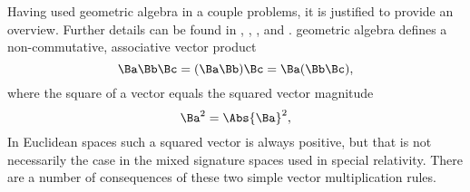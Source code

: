 %
%
%
Having used geometric algebra in a couple problems, it is justified to provide an overview.  Further details can be found in
\citep{dorst2007gac},
\citep{doran2003gap},
\citep{aMacdonaldVAGC},
and
\citep{hestenes1999nfc}.
%
geometric algebra defines a non-commutative, associative vector product
%
\begin{equation}\label{eqn:gaTutorial:20}
\Ba \Bb \Bc
=
(\Ba \Bb) \Bc
=
\Ba (\Bb \Bc),
\end{equation}
%
where the square of a vector equals the squared vector magnitude
%
\begin{dmath}\label{eqn:gaTutorial:40}
\Ba^2 = \Abs{\Ba}^2,
\end{dmath}
%
In Euclidean spaces such a squared vector is always positive, but that is not necessarily the case in the mixed signature spaces used in special relativity.
%
There are a number of consequences of these two simple vector multiplication rules.
%
